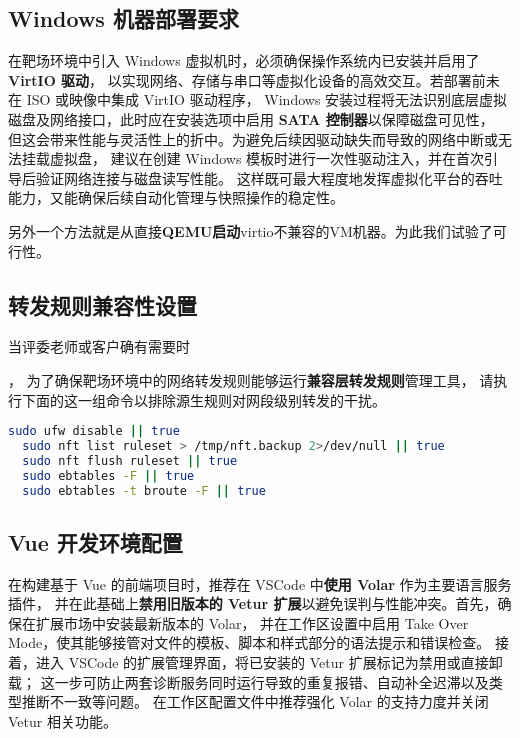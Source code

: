 \documentclass[lang=cn,10pt]{elegantbook}
\begin{document}
\subsection{Windows 机器部署要求}
在靶场环境中引入 Windows 虚拟机时，必须确保操作系统内已安装并启用了 \textbf{VirtIO 驱动}，
以实现网络、存储与串口等虚拟化设备的高效交互。若部署前未在 ISO 或映像中集成 VirtIO 驱动程序，
Windows 安装过程将无法识别底层虚拟磁盘及网络接口，此时应在安装选项中启用 \textbf{SATA 控制器}以保障磁盘可见性，
但这会带来性能与灵活性上的折中。为避免后续因驱动缺失而导致的网络中断或无法挂载虚拟盘，
建议在创建 Windows 模板时进行一次性驱动注入，并在首次引导后验证网络连接与磁盘读写性能。
这样既可最大程度地发挥虚拟化平台的吞吐能力，又能确保后续自动化管理与快照操作的稳定性。

另外一个方法就是从直接\textbf{QEMU启动}virtio不兼容的VM机器。为此我们试验了可行性。


\subsection{转发规则兼容性设置}

\hypertarget{subsec:forward_setting}{当评委老师或客户确有需要时}，
为了确保靶场环境中的网络转发规则能够运行\textbf{兼容层转发规则}管理工具，
请执行下面的这一组命令以排除源生规则对网段级别转发的干扰。


\begin{lstlisting}[language=bash]
  sudo ufw disable || true
  sudo nft list ruleset > /tmp/nft.backup 2>/dev/null || true
  sudo nft flush ruleset || true
  sudo ebtables -F || true
  sudo ebtables -t broute -F || true
\end{lstlisting}

\subsection{Vue 开发环境配置}
在构建基于 Vue 的前端项目时，推荐在 VSCode 中\textbf{使用 Volar} 作为主要语言服务插件，
并在此基础上\textbf{禁用旧版本的 Vetur 扩展}以避免误判与性能冲突。首先，确保在扩展市场中安装最新版本的 Volar，
并在工作区设置中启用 Take Over Mode，使其能够接管对文件的模板、脚本和样式部分的语法提示和错误检查。
接着，进入 VSCode 的扩展管理界面，将已安装的 Vetur 扩展标记为禁用或直接卸载；
这一步可防止两套诊断服务同时运行导致的重复报错、自动补全迟滞以及类型推断不一致等问题。
在工作区配置文件中推荐强化 Volar 的支持力度并关闭 Vetur 相关功能。
\end{document}
